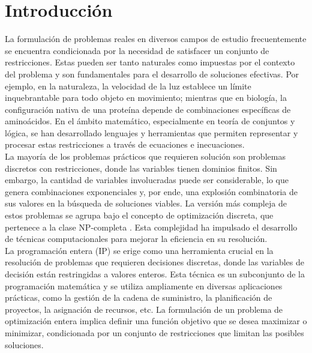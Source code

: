 \documentclass[12pt]{report}
\begin{document}
\newpage



\tableofcontents

\newpage
\chapter{Introducción}

La formulación de problemas reales en diversos campos de estudio frecuentemente se encuentra condicionada por la necesidad de satisfacer un conjunto de restricciones. Estas pueden ser tanto naturales como impuestas por el contexto del problema y son fundamentales para el desarrollo de soluciones efectivas. Por ejemplo, en la naturaleza, la velocidad de la luz establece un límite inquebrantable para todo objeto en movimiento; mientras que en biología, la configuración nativa de una proteína depende de combinaciones específicas de aminoácidos. En el ámbito matemático, especialmente en teoría de conjuntos y lógica, se han desarrollado lenguajes y herramientas que permiten representar y procesar estas restricciones a través de ecuaciones e inecuaciones. \\

La mayoría de los problemas prácticos que requieren solución son problemas discretos con restricciones, donde las variables tienen dominios finitos. Sin embargo, la cantidad de variables involucradas puede ser considerable, lo que genera combinaciones exponenciales y, por ende, una explosión combinatoria de sus valores en la búsqueda de soluciones viables. La versión más compleja de estos problemas se agrupa bajo el concepto de optimización discreta, que pertenece a la clase NP-completa \cite{Karp}. Esta complejidad ha impulsado el desarrollo de técnicas computacionales para mejorar la eficiencia en su resolución.  \\

La programación entera (IP) \cite{Williams} se erige como una herramienta crucial en la resolución de problemas que requieren decisiones discretas, donde las variables de decisión están restringidas a valores enteros. Esta técnica es un subconjunto de la programación matemática y se utiliza ampliamente en diversas aplicaciones prácticas, como la gestión de la cadena de suministro, la planificación de proyectos, la asignación de recursos, etc. La formulación de un problema de optimización entera implica definir una función objetivo que se desea maximizar o minimizar, condicionada por un conjunto de restricciones que limitan las posibles soluciones.  \\
\end{document}
